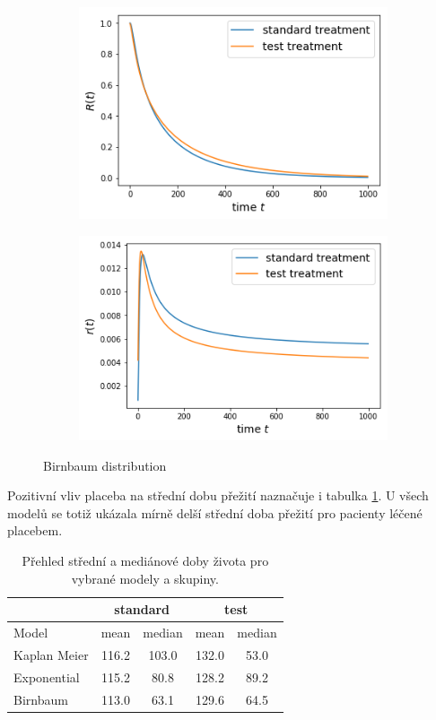 \documentclass[10pt]{article}
\begin{document}
    \begin{figure}[htb!]
\centering
    \begin{subfigure}{.4\linewidth}
    \centering
    \includegraphics[width=.99\textwidth]{Images/treat/Sbir.png}
  \end{subfigure}%
    \begin{subfigure}{.4\linewidth}
    \centering
    \includegraphics[width=.99\textwidth]{Images/treat/rbir.png}
  \end{subfigure}%
  \caption{Birnbaum distribution}\label{fig:karexp} 
   \end{figure} 
Pozitivní vliv placeba na střední dobu přežití naznačuje i tabulka \ref{tab:treasdat}. U všech modelů se totiž ukázala mírně delší střední doba přežití pro pacienty léčené placebem.   
\begin{table}[htb!]
\centering
\begin{tabular}{lcccc}
 &  \multicolumn{2}{c}{standard} & \multicolumn{2}{c}{test}\\ 
\toprule
Model & mean & median & mean & median \\
\midrule
Kaplan Meier & 116.2 & 103.0 & 132.0 & 53.0 \\
Exponential & 115.2 & 80.8 & 128.2 & 89.2\\
Birnbaum & 113.0  & 63.1 & 129.6 & 64.5 \\
\end{tabular}
\caption{Přehled střední a mediánové doby života pro vybrané modely a skupiny.}\label{tab:treasdat}
\end{table}
\end{document}
